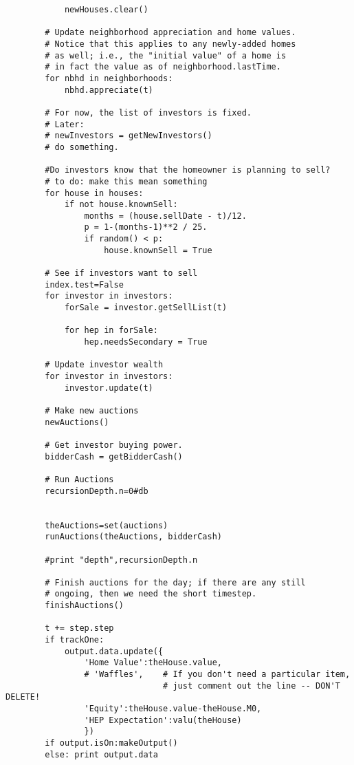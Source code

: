\begin{lstlisting}
            newHouses.clear()

        # Update neighborhood appreciation and home values.
        # Notice that this applies to any newly-added homes
        # as well; i.e., the "initial value" of a home is
        # in fact the value as of neighborhood.lastTime.
        for nbhd in neighborhoods:
            nbhd.appreciate(t)

        # For now, the list of investors is fixed.
        # Later:
        # newInvestors = getNewInvestors()
        # do something.

        #Do investors know that the homeowner is planning to sell?
        # to do: make this mean something
        for house in houses:
            if not house.knownSell:
                months = (house.sellDate - t)/12.
                p = 1-(months-1)**2 / 25.
                if random() < p:
                    house.knownSell = True

        # See if investors want to sell
        index.test=False
        for investor in investors:
            forSale = investor.getSellList(t)
            
            for hep in forSale:
                hep.needsSecondary = True

        # Update investor wealth
        for investor in investors:
            investor.update(t)
        
        # Make new auctions
        newAuctions()

        # Get investor buying power.
        bidderCash = getBidderCash()

        # Run Auctions
        recursionDepth.n=0#db
        

        theAuctions=set(auctions)
        runAuctions(theAuctions, bidderCash)
        
        #print "depth",recursionDepth.n
        
        # Finish auctions for the day; if there are any still
        # ongoing, then we need the short timestep.
        finishAuctions()

        t += step.step
        if trackOne:
            output.data.update({
                'Home Value':theHouse.value,
                # 'Waffles',    # If you don't need a particular item,
                                # just comment out the line -- DON'T DELETE!
                'Equity':theHouse.value-theHouse.M0,
                'HEP Expectation':valu(theHouse)
                })
        if output.isOn:makeOutput()             
        else: print output.data


\end{lstlisting}
